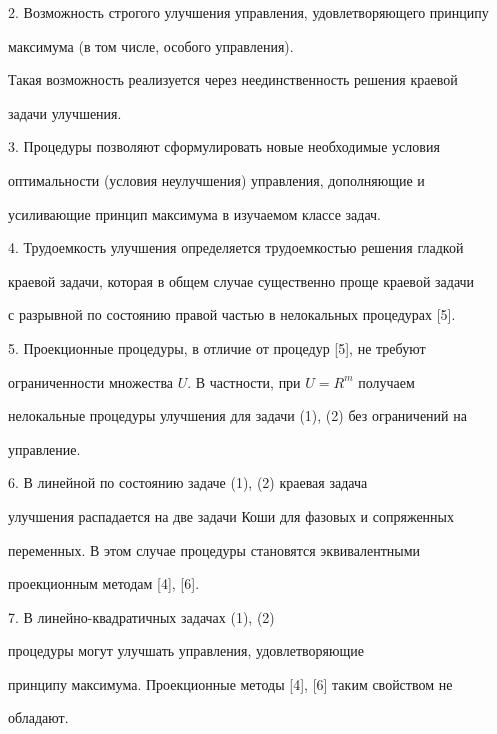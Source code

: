 2. Возможность строгого улучшения управления, удовлетворяющего принципу


максимума (в том числе, особого управления).


Такая возможность реализуется через неединственность решения краевой


задачи улучшения.





3. Процедуры позволяют сформулировать новые необходимые условия


оптимальности (условия неулучшения) управления, дополняющие и


усиливающие принцип максимума в изучаемом классе задач.





4. Трудоемкость улучшения определяется трудоемкостью решения гладкой


краевой задачи, которая в общем случае существенно проще краевой задачи


с разрывной по состоянию правой частью в нелокальных процедурах [5].





5. Проекционные процедуры, в отличие от процедур [5], не требуют


ограниченности множества $U$. В частности, при $U=R^m$ получаем


нелокальные процедуры улучшения для задачи (1), (2) без ограничений на


управление.





6. В линейной по состоянию задаче (1), (2) краевая задача


улучшения распадается на две задачи Коши для фазовых и сопряженных


переменных. В этом случае процедуры становятся эквивалентными


проекционным методам [4], [6].





7. В линейно-квадратичных задачах (1), (2)


процедуры могут улучшать управления, удовлетворяющие


принципу максимума. Проекционные методы [4], [6] таким свойством не


обладают.








